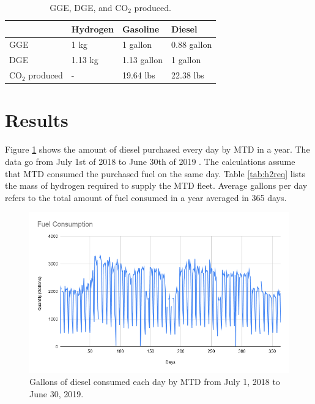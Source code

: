 \documentclass{anstrans}
\begin{document}
\begin{table}[!h]
	\centering
    \caption{GGE, DGE, and CO$_2$ produced.}
    \label{tab:meth}
	\begin{tabular}{l|lll}
	\hline
	                 & Hydrogen & Gasoline    & Diesel      \\ \hline
	GGE              & 1 kg     & 1 gallon    & 0.88 gallon \\
	DGE              & 1.13 kg  & 1.13 gallon & 1 gallon    \\
    CO$_2$ produced  & -        & 19.64 lbs   & 22.38 lbs   \\ \hline

	\end{tabular}
\end{table}

\section{Results}

Figure \ref{fig:mtdfuel} shows the amount of diesel purchased every day by MTD in a year. The data go from July 1st of 2018 to June 30th of 2019 \cite{mtd_irecords_2019}. The calculations assume that MTD consumed the purchased fuel on the same day.
Table \ref{tab:h2req} lists the mass of hydrogen required to supply the MTD fleet. Average gallons per day refers to the total amount of fuel consumed in a year averaged in 365 days. 

\begin{figure}[!h]
	\centering
	\includegraphics[width=1.05\linewidth]{figures/fuelconsumption.png}
	\hfill
	\caption{Gallons of diesel consumed each day by MTD from July 1, 2018 to June 30, 2019.}
	\label{fig:mtdfuel}
\end{figure}
\end{document}
